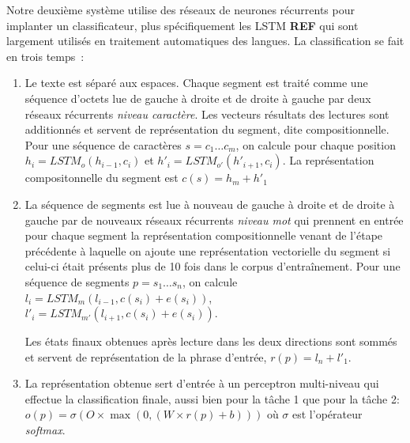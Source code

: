 Notre deuxième système utilise des réseaux de neurones récurrents pour implanter un classificateur, plus spécifiquement les LSTM \textbf{REF} qui sont largement utilisés en traitement automatiques des langues.
La classification se fait en trois temps~:
\begin{enumerate}
\item Le texte est séparé aux espaces.
  Chaque segment est traité comme une séquence d'octets lue de gauche à droite et de droite à gauche par deux réseaux récurrents \emph{niveau caractère}.
  Les vecteurs résultats des lectures sont additionnés et servent de
  représentation du segment, dite compositionnelle. Pour une séquence
  de caractères $s = c_{1}\ldots c_{m}$, on calcule pour chaque position
  $h_{i} = LSTM_{o}(h_{i-1},c_{i})$ et $h'_{i} =
  LSTM_{o'}(h'_{i+1},c_{i})$. La représentation compositonnelle du
  segment est $c(s) = h_{m} + h'_{1}$

\item La séquence de segments est lue à nouveau de gauche à droite et
  de droite à gauche par de nouveaux réseaux récurrents \emph{niveau
    mot} qui prennent en entrée pour chaque segment la représentation
  compositionnelle venant de l'étape précédente à laquelle on ajoute
  une représentation vectorielle du segment si celui-ci était présents
  plus de 10 fois dans le corpus d'entraînement.
  Pour une séquence de segments $p = s_{1} \ldots s_{n}$, on calcule
  $l_{i} = LSTM_{m}(l_{i-1},c(s_{i}) + e(s_{i}))$, $l'_{i} =
  LSTM_{m'}(l_{i+1},c(s_{i}) + e(s_{i}))$.

   Les états finaux obtenues après lecture dans les deux directions
  sont sommés et servent de représentation de la phrase d'entrée,
  $r(p) = l_{n} + l'_{1}$.

\item La représentation obtenue sert d'entrée à un perceptron multi-niveau qui
  effectue la classification finale, aussi bien pour la tâche 1 que
  pour la tâche 2:  $o(p) = \sigma(O \times \max(0, (W \times r(p) +
  b)))$ où $\sigma$ est l'opérateur \emph{softmax}.
\end{enumerate}


